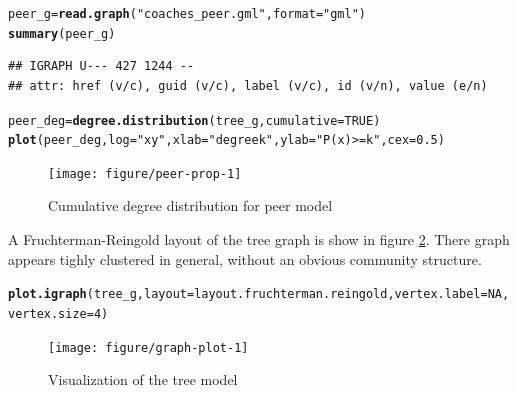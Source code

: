 \documentclass[11pt]{article}\usepackage[]{graphicx}\usepackage[]{color}
\makeatletter
\newcommand{\hlnum}[1]{\textcolor[rgb]{0.686,0.059,0.569}{#1}}%
\newcommand{\hlstr}[1]{\textcolor[rgb]{0.192,0.494,0.8}{#1}}%
\newcommand{\hlstd}[1]{\textcolor[rgb]{0.345,0.345,0.345}{#1}}%
\newcommand{\hlkwb}[1]{\textcolor[rgb]{0.69,0.353,0.396}{#1}}%
\newcommand{\hlkwc}[1]{\textcolor[rgb]{0.333,0.667,0.333}{#1}}%
\newcommand{\hlkwd}[1]{\textcolor[rgb]{0.737,0.353,0.396}{\textbf{#1}}}%
\newenvironment{kframe}{%
 \def\at@end@of@kframe{}%
 \ifinner\ifhmode%
  \def\at@end@of@kframe{\end{minipage}}%
  \begin{minipage}{\columnwidth}%
 \fi\fi%
 \def\FrameCommand##1{\hskip\@totalleftmargin \hskip-\fboxsep
 \colorbox{shadecolor}{##1}\hskip-\fboxsep
     \hskip-\linewidth \hskip-\@totalleftmargin \hskip\columnwidth}%
 \MakeFramed {\advance\hsize-\width
   \@totalleftmargin\z@ \linewidth\hsize
   \@setminipage}}%
 {\par\unskip\endMakeFramed%
 \at@end@of@kframe}
\newenvironment{knitrout}{}{} %
\makeatother
\begin{document}
\begin{knitrout}
\color{fgcolor}\begin{kframe}
\begin{alltt}
\hlstd{peer_g} \hlkwb{=} \hlkwd{read.graph}\hlstd{(}\hlstr{"coaches_peer.gml"}\hlstd{,}\hlkwc{format}\hlstd{=}\hlstr{"gml"}\hlstd{)}
\hlkwd{summary}\hlstd{(peer_g)}
\end{alltt}
\begin{verbatim}
## IGRAPH U--- 427 1244 -- 
## attr: href (v/c), guid (v/c), label (v/c), id (v/n), value (e/n)
\end{verbatim}
\begin{alltt}
\hlstd{peer_deg} \hlkwb{=} \hlkwd{degree.distribution}\hlstd{(tree_g,} \hlkwc{cumulative} \hlstd{=} \hlnum{TRUE}\hlstd{)}
\hlkwd{plot}\hlstd{(peer_deg,}\hlkwc{log}\hlstd{=}\hlstr{"xy"}\hlstd{,}\hlkwc{xlab}\hlstd{=}\hlstr{"degree k"}\hlstd{,}\hlkwc{ylab}\hlstd{=}\hlstr{"P(x) >= k"}\hlstd{,}\hlkwc{cex}\hlstd{=}\hlnum{0.5}\hlstd{)}
\end{alltt}
\end{kframe}\begin{figure}

{\centering \texttt{[image: figure/peer-prop-1]} 

}

\caption[Cumulative degree distribution for peer model]{Cumulative degree distribution for peer model\label{fig:peer-prop}}
\end{figure}


\end{knitrout}

A Fruchterman-Reingold layout of the tree graph is show in figure
\ref{fig:graph-plot}.  There graph appears tighly clustered in general, without
an obvious community structure.

\begin{knitrout}
\color{fgcolor}\begin{kframe}
\begin{alltt}
\hlkwd{plot.igraph}\hlstd{(tree_g,} \hlkwc{layout}\hlstd{=layout.fruchterman.reingold,} \hlkwc{vertex.label}\hlstd{=}\hlnum{NA}\hlstd{,} \hlkwc{vertex.size}\hlstd{=}\hlnum{4}\hlstd{)}
\end{alltt}
\end{kframe}\begin{figure}

{\centering \texttt{[image: figure/graph-plot-1]} 

}

\caption[Visualization of the tree model]{Visualization of the tree model\label{fig:graph-plot}}
\end{figure}


\end{knitrout}
\end{document}
